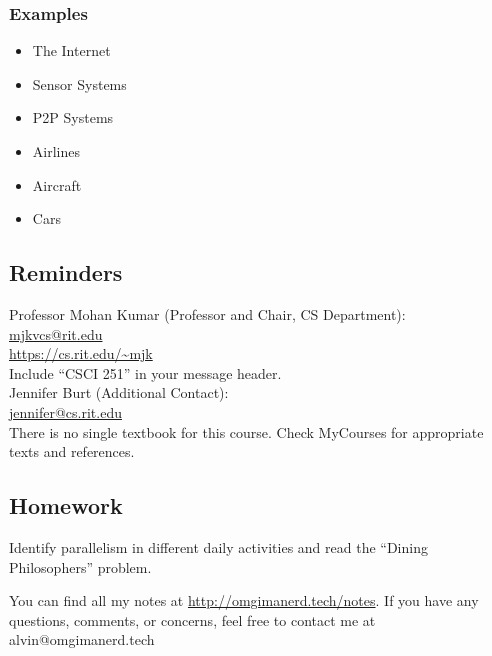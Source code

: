 \documentclass[letterpaper, 12pt]{article}
\begin{document}
\subsubsection*{Examples}
\begin{itemize}
  \item The Internet
  \item Sensor Systems
  \item P2P Systems
  \item Airlines
  \item Aircraft
  \item Cars
\end{itemize}

\subsection*{Reminders}
Professor Mohan Kumar (Professor and Chair, CS Department): \\
\url{mjkvcs@rit.edu} \\
\url{https://cs.rit.edu/~mjk} \\
Include ``CSCI 251'' in your message header. \\

\noindent Jennifer Burt (Additional Contact): \\
\url{jennifer@cs.rit.edu} \\

There is no single textbook for this course. Check MyCourses for appropriate
texts and references.

\subsection*{Homework}
Identify parallelism in different daily activities and read the
``Dining Philosophers'' problem.

\begin{center}
  You can find all my notes at \url{http://omgimanerd.tech/notes}. If you have
  any questions, comments, or concerns, feel free to contact me at
  alvin@omgimanerd.tech
\end{center}
\end{document}
